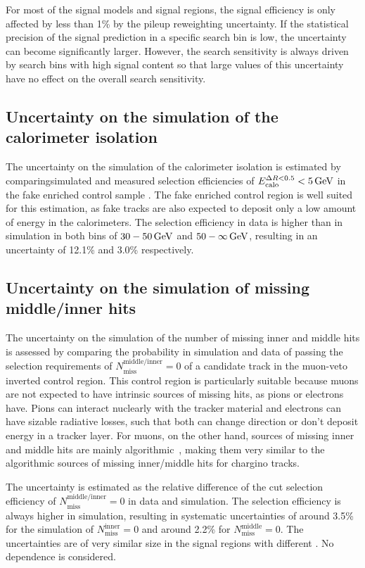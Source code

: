 For most of the signal models and signal regions, the signal efficiency is only affected by less than 1\% by the pileup reweighting uncertainty.
If the statistical precision of the signal prediction in a specific search bin is low, the uncertainty can become significantly larger.
However, the search sensitivity is always driven by search bins with high signal content so that large values of this uncertainty have no effect on the overall search sensitivity.

\subsection*{Uncertainty on the simulation of the calorimeter isolation}
The uncertainty on the simulation of the calorimeter isolation \ecalo is estimated by comparingsimulated and measured selection efficiencies of $E^{\Delta R<0.5}_{\text{calo}}<5\,\text{Ge}\kern-0.06667em\text{V}$ in the fake enriched control sample \fakeCR.
The fake enriched control region is well suited for this estimation, as fake tracks are also expected to deposit only a low amount of energy in the calorimeters.
The selection efficiency in data is higher than in simulation in both \pt bins of $30-50\,\text{Ge}\kern-0.06667em\text{V}$ and $50-\infty\,\text{Ge}\kern-0.06667em\text{V}$, resulting in an uncertainty of 12.1\% and 3.0\% respectively.

\subsection*{Uncertainty on the simulation of missing middle/inner hits}
The uncertainty on the simulation of the number of missing inner and middle hits is assessed by comparing the probability in simulation and data of passing the selection requirements of $N_{\text{miss}}^{\text{middle/inner}}=0$
of a candidate track in the muon-veto inverted control region. 
This control region is particularly suitable because muons are not expected to have intrinsic sources of missing hits, as \eg pions or electrons have.
Pions can interact nuclearly with the tracker material and electrons can have sizable radiative losses, such that both can change direction or don't deposit energy in a tracker layer.
For muons, on the other hand, sources of missing inner and middle hits are mainly algorithmic~\cite{bib:CMS:DT_Thesis,bib:CMS:DT_8TeV_AN}, 
making them very similar to the algorithmic sources of missing inner/middle hits for chargino tracks.

The uncertainty is estimated as the relative difference of the cut selection efficiency of $N_{\text{miss}}^{\text{middle/inner}}=0$ in data and simulation.
The selection efficiency is always higher in simulation, resulting in systematic uncertainties of around 3.5\% for the simulation of $N_{\text{miss}}^{\text{inner}}=0$ and around 2.2\% for $N_{\text{miss}}^{\text{middle}}=0$.
The uncertainties are of very similar size in the signal regions with different \pt.
No \ias dependence is considered.

